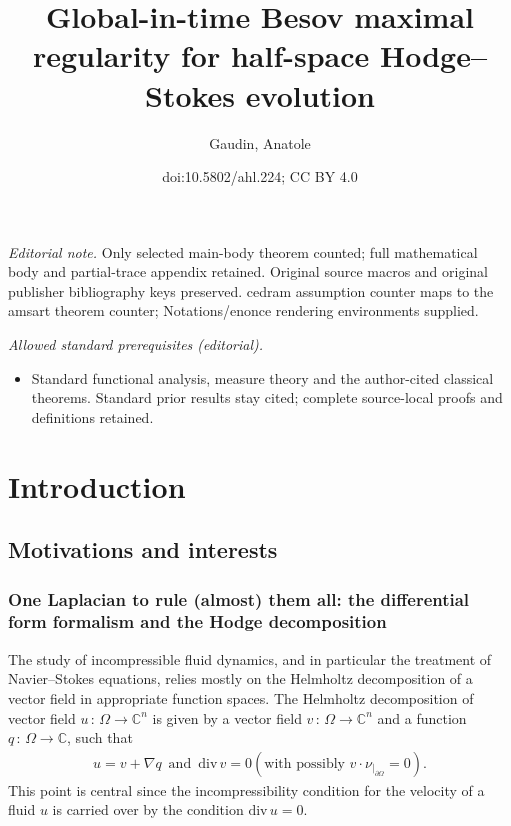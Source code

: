 \documentclass[10pt]{amsart}
\title{Global-in-time Besov maximal regularity for half-space Hodge--Stokes evolution}
\author{Gaudin, Anatole}
\date{doi:10.5802/ahl.224; CC BY 4.0}
\theoremstyle{definition}\newtheorem{defi}[theo]{Definition}\newtheorem{rema}[theo]{Remark}\newtheorem{exam}[theo]{Example}\newtheorem{exem}[theo]{Example}\newtheorem{nota}[theo]{Notation}
\renewcommand*{\div}{\mathrm{div\,}}
\newcommand{\bbC}{\mathbb{C}}
\begin{document}
\maketitle
\noindent\textit{Editorial note.} Only selected main-body theorem counted; full mathematical body and partial-trace appendix retained. Original source macros and original publisher bibliography keys preserved. cedram assumption counter maps to the amsart theorem counter; Notations/enonce rendering environments supplied.\par\medskip
\noindent\textit{Allowed standard prerequisites (editorial).}\begin{itemize}
\item Standard functional analysis, measure theory and the author-cited classical theorems. Standard prior results stay cited; complete source-local proofs and definitions retained.
\end{itemize}\medskip
\setcounter{tocdepth}{3}
\tableofcontents

\section{Introduction}


\subsection{Motivations and interests}

\subsubsection{One Laplacian to rule (almost) them all: the differential form formalism and the Hodge decomposition}

The study of incompressible fluid dynamics, and in particular the treatment of Navier--Stokes equations, relies mostly on the Helmholtz decomposition of a vector field in appropriate function spaces. The Helmholtz decomposition of vector field $u\,:\,\Omega \longrightarrow \bbC^n$ is given by a vector field $v\,:\,\Omega \longrightarrow \bbC^n$ and a function $q\,:\,\Omega \longrightarrow \bbC$, such that
\begin{align*}
u = v+\nabla q \,\text{ and }\, \div v = 0  \left(\text{with possibly } v\cdot\nu_{|_{\partial\Omega}} = 0 \right).
\end{align*}
This point is central since the incompressibility condition for the velocity of a fluid $u$ is carried over by the condition $\div u=0$.
\end{document}
